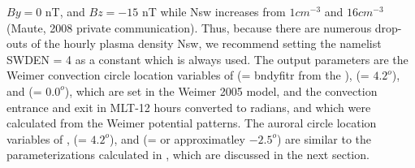 $By=0$ nT, and $Bz=-15$ nT while Nsw increases from $1 cm^{-3}$ and $16 cm^{-3}$
(Maute, 2008 private communication).
Thus, because there are numerous drop-outs of the hourly plasma density Nsw,
we recommend setting the namelist SWDEN = 4 as a constant which is always
used.
%
The output parameters are the Weimer convection circle location variables of
 (= bndyfitr from the ),  (= $4.2^o$), and  (= $0.0^o$),
which are set in the Weimer 2005 model, and the convection entrance and exit in
MLT-12 hours converted to radians,  and  which were calculated
from the Weimer potential patterns.  The auroral circle location variables of
,  (= $4.2^o$), and  (=  or
approximatley $-2.5^o$) are similar to
the parameterizations calculated in , which are discussed in the next
section.
%
%
